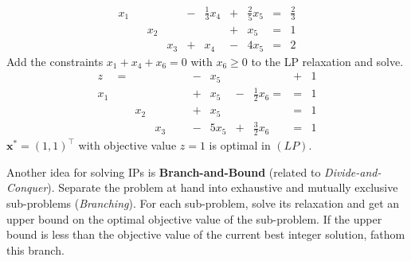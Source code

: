 \begin{exbox}
\begin{example}
\[\begin{array}{cccccccccc}
                x_1 &   &     &     & - & \frac{1}{3} x_4 & + & \frac{2}{5} x_5 & = & \frac{2}{3} \\
                    &   & x_2 &     &   &                 & + & x_5             & = & 1           \\
                    &   &     & x_3 & + & x_4             & - & 4x_5            & = & 2
            \end{array}
        \]
        Add the constraints $ x_1+x_4+x_6=0 $ with $ x_6\geqslant 0 $ to the LP relaxation and solve.
        \[
            \begin{array}{cccccccccccc}
                z   & = &     &     &  &  & - & x_5  &   &                   & + & 1 \\
                x_1 &   &     &     &  &  & + & x_5  & - & \frac{1}{2} x_6 = & = & 1 \\
                    &   & x_2 &     &  &  & + & x_5  &   &                   & = & 1 \\
                    &   &     & x_3 &  &  & - & 5x_5 & + & \frac{3}{2} x_6   & = & 1
            \end{array}
        \]
        $ \bm{x}^*=(1,1)^\top $ with objective value $ z=1 $ is optimal in $ (LP) $.
    \end{example}
\end{exbox}

Another idea for solving IPs is \textbf{Branch-and-Bound} (related to \emph{Divide-and-Conquer}).
Separate the problem at hand into exhaustive and mutually exclusive sub-problems (\emph{Branching}).
For each sub-problem, solve its relaxation and get an upper bound on the optimal objective
value of the sub-problem. If the upper bound is less than the objective value of the current
best integer solution, fathom this branch.
